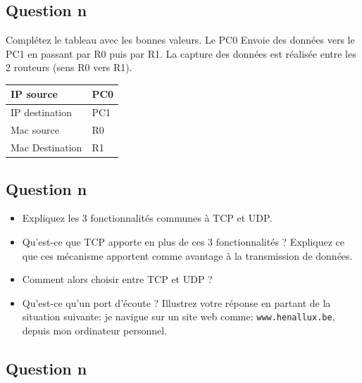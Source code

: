 \documentclass[a4paper]{article}
\begin{document}
\subsection{Question n}





Complétez le tableau avec les bonnes valeurs. Le PC0 Envoie des données vers le PC1 en passant par R0 puis par R1. La capture des données est réalisée entre les 2 routeurs (sens R0 vers R1).
\begin{center}
\begin{tabular}{|l|l|} \hline
    IP source & PC0 \\ \hline
    IP destination & PC1 \\ \hline
    Mac source & R0 \\ \hline
    Mac Destination & R1 \\ \hline
\end{tabular}
\end{center}










\subsection{Question n}





\begin{itemize}
    \item Expliquez les 3 fonctionnalités communes à TCP et UDP.
    \item Qu’est-ce que TCP apporte en plus de ces 3 fonctionnalités ? Expliquez ce que ces mécanisme apportent comme avantage à la transmission de données.
    \item Comment alors choisir entre TCP et UDP ?
    \item Qu’est-ce qu’un port d’écoute ? Illustrez votre réponse en partant de la situation suivante: je navigue sur un site web comme: \texttt{www.henallux.be}, depuis mon ordinateur personnel.
\end{itemize}










\subsection{Question n}
\end{document}
